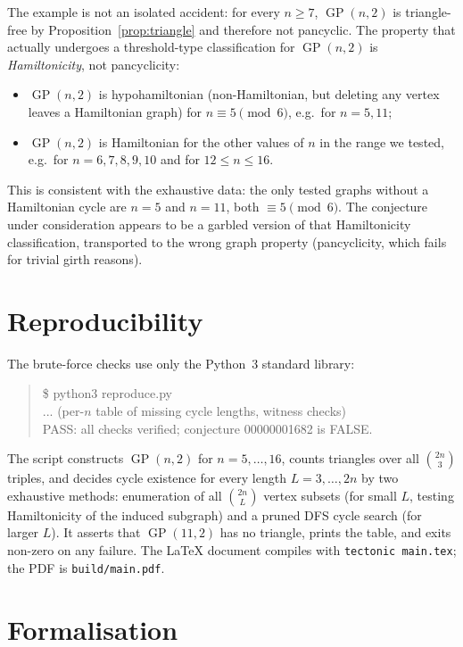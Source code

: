 \documentclass[11pt]{article}
\theoremstyle{definition}
\theoremstyle{remark}
\newcommand{\GP}{\operatorname{GP}}
\begin{document}
The example is not an isolated accident: for every $n \ge 7$, $\GP(n,2)$ is
triangle-free by Proposition~\ref{prop:triangle} and therefore not pancyclic.
The property that actually undergoes a threshold-type classification for
$\GP(n,2)$ is \emph{Hamiltonicity}, not pancyclicity:
\begin{itemize}
\item $\GP(n,2)$ is hypohamiltonian (non-Hamiltonian, but deleting any vertex
leaves a Hamiltonian graph) for $n \equiv 5 \pmod 6$, e.g.\ for $n = 5, 11$;
\item $\GP(n,2)$ is Hamiltonian for the other values of $n$ in the range we
tested, e.g.\ for $n = 6, 7, 8, 9, 10$ and for $12 \le n \le 16$.
\end{itemize}
This is consistent with the exhaustive data: the only tested graphs without a
Hamiltonian cycle are $n = 5$ and $n = 11$, both $\equiv 5 \pmod 6$. The
conjecture under consideration appears to be a garbled version of that
Hamiltonicity classification, transported to the wrong graph property
(pancyclicity, which fails for trivial girth reasons).

\section{Reproducibility}

The brute-force checks use only the Python~3 standard library:
\begin{quote}\ttfamily
\$ python3 reproduce.py\\
... (per-$n$ table of missing cycle lengths, witness checks)\\
PASS: all checks verified; conjecture 00000001682 is FALSE.
\end{quote}
The script constructs $\GP(n,2)$ for $n = 5,\dots,16$, counts triangles over all
$\binom{2n}{3}$ triples, and decides cycle existence for every length
$L = 3,\dots,2n$ by two exhaustive methods: enumeration of all $\binom{2n}{L}$
vertex subsets (for small $L$, testing Hamiltonicity of the induced subgraph)
and a pruned DFS cycle search (for larger $L$). It asserts that $\GP(11,2)$ has
no triangle, prints the table, and exits non-zero on any failure. The LaTeX
document compiles with \texttt{tectonic main.tex}; the PDF is
\texttt{build/main.pdf}.

\section{Formalisation}
\end{document}

